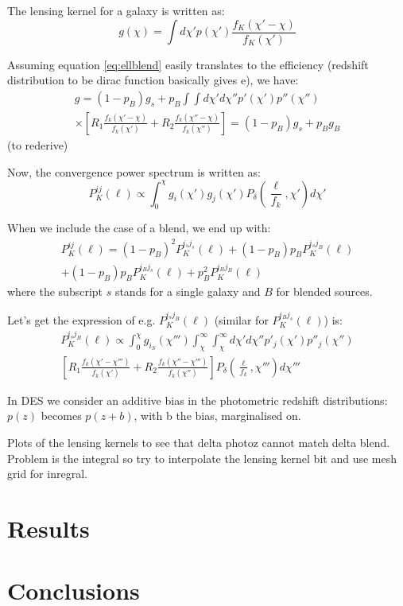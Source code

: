 \documentclass[prd,amsmath,aps,floats,amssymb, floatfix, superscriptaddress,nofootinbib,preprintnumbers,twocolumn]{article}  %
\begin{document}
The lensing kernel for a galaxy is written as: 
\begin{equation}
g(\chi) = \int d\chi' p(\chi') \frac{f_K(\chi' - \chi)}{f_K(\chi')}
\end{equation}

Assuming equation \ref{eq:ellblend} easily translates to the efficiency (redshift distribution to be dirac function basically gives e), we have: 
\begin{multline}
g = (1 - p_B) g_s + p_B  \int \int d\chi' d\chi'' p'(\chi')p''(\chi'')  \\
\times [ R_1  \frac{f_k (\chi' - \chi)}{f_k (\chi')} 
+ R_2 \frac{f_k (\chi'' - \chi)}{f_k (\chi'')}   ] 
= (1 - p_B) g_s + p_B g_B
\end{multline}
(to rederive)

Now, the convergence power spectrum is written as:
\begin{equation}
P_K^{ij}(\ell) \propto \int_0^{\chi} g_i(\chi') g_j(\chi') P_{\delta} (\frac{\ell}{f_k},\chi') d\chi'
\end{equation}

When we include the case of a blend, we end up with: 
\begin{multline}
P_K^{ij}(\ell) =  (1 - p_B)^2 P_{K}^{i_s j_s}(\ell)  + (1 - p_B) p_B  P_{K}^{i_s j_B}(\ell) \\
+ (1 - p_B) p_B  P_{K}^{i_B j_s}(\ell) + p_B ^2 P_{K}^{i_B j_B}(\ell) 
\end{multline}
where the subscript $s$ stands for a single galaxy and $B$ for blended sources. 

Let's get the expression of e.g. $P_{K}^{i_s j_B}(\ell)$ (similar for $P_{K}^{i_B j_s}(\ell)$) is:
\begin{multline}
P_K^{i_sj_B}(\ell) \propto \int_0^{\chi} g_{i_S}(\chi''') \int_{\chi}^{\infty} \int_{\chi}^{\infty} d\chi' d\chi'' p'_j(\chi')p''_j(\chi'')  \\
[ R_1  \frac{f_k (\chi' - \chi''')}{f_k (\chi')} 
+ R_2 \frac{f_k (\chi'' - \chi''')}{f_k (\chi'')}   ]   P_{\delta} (\frac{\ell}{f_k},\chi''') d\chi'''
\end{multline}

In DES we consider an additive bias in the photometric redshift distributions: $p(z)$ becomes $p(z+b)$, with b the bias, marginalised on. 

Plots of the lensing kernels to see that delta photoz cannot match delta blend. Problem is the integral so try to interpolate the lensing kernel bit and use mesh grid for inregral. 





\section{Results}
\label{sec:results}

\section{Conclusions}
\label{sec:ccl}
\end{document}
